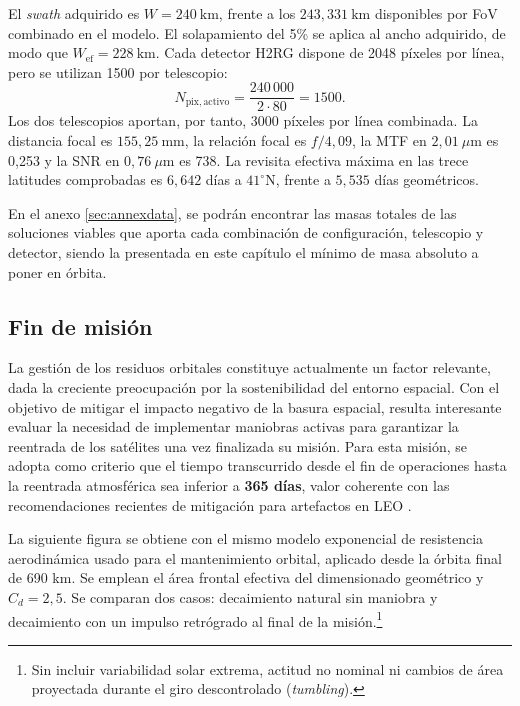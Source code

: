 El \textit{swath} adquirido es \(W=240\ \mathrm{km}\), frente a los \(243{,}331\ \mathrm{km}\) disponibles por FoV combinado en el modelo. El solapamiento del 5\% se aplica al ancho adquirido, de modo que \(W_{\mathrm{ef}}=228\ \mathrm{km}\). Cada detector H2RG dispone de 2048 píxeles por línea, pero se utilizan 1500 por telescopio:
\[
N_{\mathrm{pix,activo}}=\frac{240\,000}{2\cdot80}=1500.
\]
Los dos telescopios aportan, por tanto, 3000 píxeles por línea combinada. La distancia focal es \(155{,}25\ \mathrm{mm}\), la relación focal es \(f/4{,}09\), la MTF en \(2{,}01\ \mu\mathrm{m}\) es 0,253 y la SNR en \(0{,}76\ \mu\mathrm{m}\) es 738. La revisita efectiva máxima en las trece latitudes comprobadas es \(6{,}642\) días a \(41^\circ\mathrm{N}\), frente a \(5{,}535\) días geométricos.

En el anexo \ref{sec:annexdata}, se podrán encontrar las masas totales de las soluciones viables que aporta cada combinación de configuración, telescopio y detector, siendo la presentada en este capítulo el mínimo de masa absoluto a poner en órbita.


\subsection{Fin de misión}

La gestión de los residuos orbitales constituye actualmente un factor relevante, dada la creciente preocupación por la sostenibilidad del entorno espacial. Con el objetivo de mitigar el impacto negativo de la basura espacial, resulta interesante evaluar la necesidad de implementar maniobras activas para garantizar la reentrada de los satélites una vez finalizada su misión. Para esta misión, se adopta como criterio que el tiempo transcurrido desde el fin de operaciones hasta la reentrada atmosférica sea inferior a \textbf{365 días}, valor coherente con las recomendaciones recientes de mitigación para artefactos en LEO \cite{nasa_deorbit_systems_2025}.

La siguiente figura se obtiene con el mismo modelo exponencial de resistencia aerodinámica usado para el mantenimiento orbital, aplicado desde la órbita final de 690 km. Se emplean el área frontal efectiva del dimensionado geométrico y \(C_d=2{,}5\). Se comparan dos casos: decaimiento natural sin maniobra y decaimiento con un impulso retrógrado al final de la misión.\footnote{Sin incluir variabilidad solar extrema, actitud no nominal ni cambios de área proyectada durante el giro descontrolado (\textit{tumbling}).}

